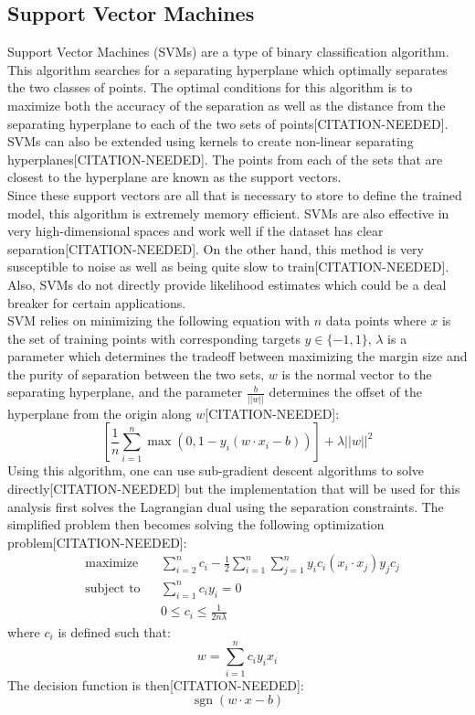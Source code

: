 \documentclass[titlepage]{article}
\DeclareMathOperator{\sgn}{sgn}
\newcommand{\norm}[1]{\lvert\lvert #1 \rvert\rvert}
\begin{document}
\subsection{Support Vector Machines}
Support Vector Machines (SVMs) are a type of binary classification algorithm. This algorithm searches for a separating hyperplane which optimally separates the two classes of points. The optimal conditions for this algorithm is to maximize both the accuracy of the separation as well as the distance from the separating hyperplane to each of the two sets of points[CITATION-NEEDED]. SVMs can also be extended using kernels to create non-linear separating hyperplanes[CITATION-NEEDED]. The points from each of the sets that are closest to the hyperplane are known as the support vectors.\\
Since these support vectors are all that is necessary to store to define the trained model, this algorithm is extremely memory efficient. SVMs are also effective in very high-dimensional spaces and work well if the dataset has clear separation[CITATION-NEEDED]. On the other hand, this method is very susceptible to noise as well as being quite slow to train[CITATION-NEEDED]. Also, SVMs do not directly provide likelihood estimates which could be a deal breaker for certain applications.\\
SVM relies on minimizing the following equation with $n$ data points where $x$ is the set of training points with corresponding targets $y \in \{-1, 1\}$, $\lambda$ is a parameter which determines the tradeoff between maximizing the margin size and the purity of separation between the two sets, $w$ is the normal vector to the separating hyperplane, and the parameter $\frac{b}{\norm{w}}$ determines the offset of the hyperplane from the origin along $w$[CITATION-NEEDED]:
$$\left[\frac{1}{n}\sum\limits_{i=1}^n \max(0, 1 - y_i(w \cdot x_i - b))\right] + \lambda\norm{w}^2$$
Using this algorithm, one can use sub-gradient descent algorithms to solve directly[CITATION-NEEDED] but the implementation that will be used for this analysis first solves the Lagrangian dual using the separation constraints. The simplified problem then becomes solving the following optimization problem[CITATION-NEEDED]:
\begin{equation*}
\begin{aligned}
& \underset{}{\text{maximize}}
& & \sum\limits_{i=2}^n c_i - \frac{1}{2}\sum\limits_{i=1}^n \sum\limits_{j=1}^n y_i c_i (x_i \cdot x_j) y_j c_j \\
& \text{subject to}
& & \sum\limits_{i=1}^n c_i y_i = 0\\
&&& 0 \leq c_i \leq \frac{1}{2n\lambda}
\end{aligned}
\end{equation*}
where $c_i$ is defined such that:
$$w = \sum\limits_{i=1}^n c_i y_i x_i$$
The decision function is then[CITATION-NEEDED]:
$$\sgn(w \cdot x - b)$$
\end{document}
